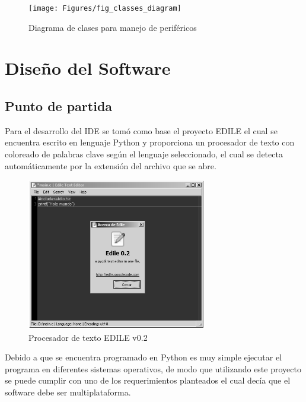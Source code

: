 \begin{figure}[ht]
  \centering
    \texttt{[image: Figures/fig\_classes\_diagram]}
  \caption{Diagrama de clases para manejo de periféricos}
  \label{fig:classes}
\end{figure}

\section{Diseño del Software}

\subsection{Punto de partida} 

Para el desarrollo del IDE se tomó como base el proyecto EDILE \cite{edile} el cual se encuentra escrito en lenguaje Python y proporciona un procesador de texto con coloreado de palabras clave según el lenguaje seleccionado, el cual se detecta automáticamente por la extensión del archivo que se abre.

\begin{figure}[ht]
  \centering
    \includegraphics[width=0.7\textwidth]{Figures/fig_edile}
  \caption{Procesador de texto EDILE v0.2}
  \label{fig:edile}
\end{figure}

Debido a que se encuentra programado en Python es muy simple ejecutar el programa en diferentes sistemas operativos, de modo que utilizando este proyecto se puede cumplir con uno de los requerimientos planteados el cual decía que el software debe ser multiplataforma.


